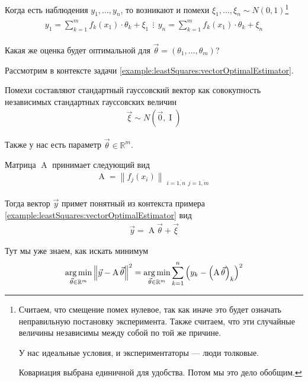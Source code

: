 Когда есть наблюдения $y_1, \dots, y_n$, то возникают и помехи
$\xi_1, \dots, \xi_n \sim N\left( 0, 1 \right)$\footnote{Считаем, что смещение
помех нулевое, так как иначе это будет означать неправильную постановку
эксперимента. Также считаем, что эти случайные величины независимы между собой
по той же причине.

У нас идеальные условия, и экспериментаторы --- люди толковые.

Ковариация выбрана единичной для удобства. Потом мы это дело обобщим.}
\begin{align*}
  \begin{array}{c}
      y_1 = \sum_{k=1}^{m} f_k\left( x_1 \right) \cdot \theta_k + \xi_1 \ \
      \vdots \ \
      y_n = \sum_{k=1}^{m} f_k\left( x_1 \right) \cdot \theta_k + \xi_n
  \end{array}
\end{align*}

Какая же оценка будет оптимальной для
$\vec{\theta} = \left( \theta_1, \dots, \theta_m \right)$?

Рассмотрим в контексте задачи \ref{example:leastSquares:vectorOptimalEstimator}.

\begin{example}
  Помехи составляют стандартный гауссовский вектор как совокупность
  независимых стандартных гауссовских величин
  \begin{align*}
      \vec{\xi} \sim N\left( \vec{0}, \operatorname{I} \right)
  \end{align*}

  Также у нас есть параметр $\vec{\theta} \in \mathbb{R}^m$.

  Матрица $\operatorname{A}$ принимает следующий вид
  \begin{align*}
      \operatorname{A} = \left\| f_j\left( x_i \right) \right\|_{
      \substack{i = \overline{1, n} \ \ j = \overline{1, m}}}
  \end{align*}

  Тогда вектор $\vec{y}$ примет понятный из контекста примера
  \ref{example:leastSquares:vectorOptimalEstimator} вид
  \begin{align*}
      \vec{y} = \operatorname{A} \vec{\theta} + \vec{\xi}
  \end{align*}

  Тут мы уже знаем, как искать минимум
  \begin{align*}
      \argminof{\left\| \vec{y} - \operatorname{A} \vec{\theta} \right\|^2}{
      \vec{\theta} \in \mathbb{R}^m}
      = \argminof{\sum_{k=1}^{n} \left( y_k
          - \left( \operatorname{A} \vec{\theta} \right)_k \right)^2}{
      \vec{\theta} \in \mathbb{R}^m}
  \end{align*}
\end{example}

